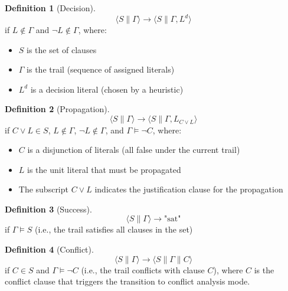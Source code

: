 \documentclass[11pt,a4paper]{article}
\theoremstyle{definition}
\newtheorem{definition}{Definition}[section]
\theoremstyle{plain}
\theoremstyle{remark}
\begin{document}
\begin{tcolorbox}[colback=blue!5!white,colframe=blue!75!black,title=\textbf{Decision Rule}]
\begin{definition}[Decision]
\[
\langle S \parallel \varGamma \rangle \rightarrow \langle S \parallel \varGamma, L^d \rangle
\]
if $L \notin \varGamma$ and $\neg L \notin \varGamma$, where:
\begin{itemize}
    \item $S$ is the set of clauses
    \item $\varGamma$ is the trail (sequence of assigned literals)
    \item $L^d$ is a decision literal (chosen by a heuristic)
\end{itemize}
\end{definition}
\end{tcolorbox}

\begin{tcolorbox}[colback=green!5!white,colframe=green!75!black,title=\textbf{Propagation Rule}]
\begin{definition}[Propagation]
\[
\langle S \parallel \varGamma \rangle \rightarrow \langle S \parallel \varGamma, L_{C\lor L} \rangle
\]
if $C \lor L \in S$, $L \notin \varGamma$, $\neg L \notin \varGamma$, and $\varGamma \models \neg C$, where:
\begin{itemize}
    \item $C$ is a disjunction of literals (all false under the current trail)
    \item $L$ is the unit literal that must be propagated
    \item The subscript $C\lor L$ indicates the justification clause for the propagation
\end{itemize}
\end{definition}
\end{tcolorbox}

\begin{tcolorbox}[colback=green!5!white,colframe=green!75!black,title=\textbf{Success Rule}]
\begin{definition}[Success]
\[
\langle S \parallel \varGamma \rangle \rightarrow \text{"sat"}
\]
if $\varGamma \models S$ (i.e., the trail satisfies all clauses in the set)
\end{definition}
\end{tcolorbox}

\begin{tcolorbox}[colback=red!5!white,colframe=red!75!black,title=\textbf{Conflict Rule}]
\begin{definition}[Conflict]
\[
\langle S \parallel \varGamma \rangle \rightarrow \langle S \parallel \varGamma \parallel C \rangle
\]
if $C \in S$ and $\varGamma \models \neg C$ (i.e., the trail conflicts with clause $C$), where $C$ is the conflict clause that triggers the transition to conflict analysis mode.
\end{definition}
\end{tcolorbox}
\end{document}
